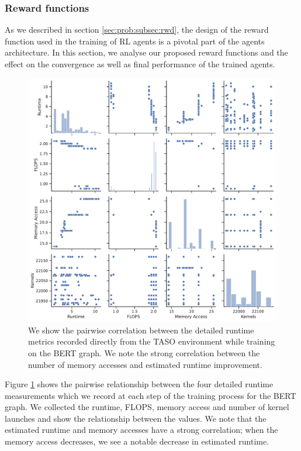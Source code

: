 \subsubsection{Reward functions}
\label{sec:eval:subsec:mf:subsubsec:rwd-func}

As we described in section \ref{sec:prob:subsec:rwd}, the design of the reward function used in the training of RL agents is a pivotal part of the agents architecture. In this section, we analyse our proposed reward functions and the effect on the convergence as well as final performance of the trained agents.

\begin{figure}[htbp]
  \centering
  \includegraphics[width=1\columnwidth]{sections/5evaluation/images/pairplot_bert.pdf}
  \caption[Pairwise plot of correlation between runtime metrics]{We show the pairwise correlation between the detailed runtime metrics recorded directly from the TASO environment while training on the BERT graph. We note the strong correlation between the number of memory accesses and estimated runtime improvement.}
  \label{fig:eval:pairplot-bert}
\end{figure}

Figure \ref{fig:eval:pairplot-bert} shows the pairwise relationship between the four detailed runtime measurements which we record at each step of the training process for the BERT graph. We collected the runtime, FLOPS, memory access and number of kernel launches and show the relationship between the values. We note that the estimated runtime and memory accesses have a strong correlation; when the memory access decreases, we see a notable decrease in estimated runtime. 

